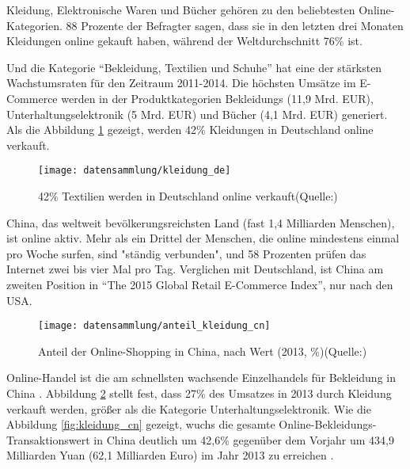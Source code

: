 Kleidung, Elektronische Waren und Bücher gehören zu den beliebtesten Online-Kategorien. 88 Prozente der Befragter sagen, dass sie in den letzten drei Monaten Kleidungen online gekauft haben, während der Weltdurchschnitt 76\% ist. \citep{HanaBen-Shabat2015}

Und die Kategorie ``Bekleidung, Textilien und Schuhe'' hat eine der stärksten Wachstumsraten für den Zeitraum 2011-2014. Die höchsten Umsätze im E-Commerce werden in der Produktkategorien Bekleidungs (11,9 Mrd. EUR), Unterhaltungselektronik (5 Mrd. EUR) und Bücher (4,1 Mrd. EUR) generiert. Als die Abbildung \ref{fig:kleidung_de} gezeigt, werden 42\% Kleidungen in Deutschland online verkauft. \citep{Spath2015} 

\begin{figure}[bth]
	\begin{center}
		\texttt{[image: datensammlung/kleidung\_de]}
		\caption[42\% Textilien werden in Deutschland online verkauft]{42\% Textilien werden in Deutschland online verkauft(Quelle:\citealp{Spath2015})}
		\label{fig:kleidung_de}
	\end{center}
\end{figure}

China, das weltweit bevölkerungsreichsten Land (fast 1,4 Milliarden Menschen), ist online aktiv. Mehr als ein Drittel der Menschen, die online mindestens einmal pro Woche surfen, sind "ständig verbunden", und 58 Prozenten prüfen das Internet zwei bis vier Mal pro Tag. Verglichen mit Deutschland, ist China am zweiten Position in ``The 2015 Global Retail E-Commerce Index'', nur nach den USA.\citep{HanaBen-Shabat2015}

\begin{figure}[htb]
	\begin{center}
		\texttt{[image: datensammlung/anteil\_kleidung\_cn]}
		\caption[Anteil der Online-Shopping in China]{Anteil der Online-Shopping in China, nach Wert (2013, \%)(Quelle:\citealp{goh2014china})}
		\label{fig:anteil_kleidung_cn}
	\end{center}
\end{figure}

Online-Handel ist die am schnellsten wachsende Einzelhandels für Bekleidung in China \citep{fung2014china}. Abbildung \ref{fig:anteil_kleidung_cn} stellt fest, dass 27\% des Umsatzes in 2013 durch Kleidung verkauft werden, größer als die Kategorie Unterhaltungselektronik. Wie die Abbildung \ref{fig:kleidung_cn} gezeigt, wuchs die gesamte Online-Bekleidungs-Transaktionswert in China deutlich um 42,6\% gegenüber dem Vorjahr um 434,9 Milliarden Yuan (62,1 Milliarden Euro) im Jahr 2013 zu erreichen \citep{fung2014china}.

